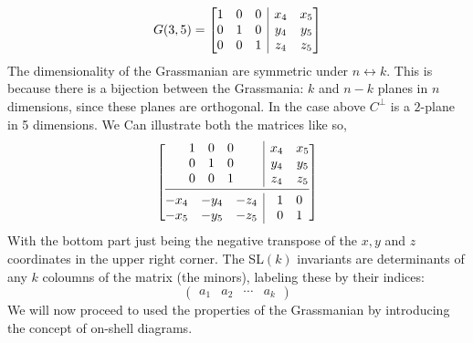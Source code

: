 \documentclass[letter,11pt]{article}
\begin{document}
\begin{equation}G(3,5) = 
\left[ \begin{array}{@{}c|c@{}}
	\begin{matrix}
		1 & 0 &  0 \\
		0 & 1 &  0 \\
		0 & 0 &  1 \\
	\end{matrix} 
	& 	\begin{matrix}
		x_4 & x_5  \\
		y_4 & y_5  \\
		z_4 & z_5  \\
	\end{matrix}  \\
\end{array} \right]
\end{equation}
The dimensionality of the Grassmanian are symmetric under $n\leftrightarrow k$. This is because there is a bijection between the Grassmania: $k$ and $n-k$ planes in $n$ dimensions, since these planes are orthogonal. In the case above $C^{\perp}$ is a $2$-plane in 5 dimensions. We Can illustrate both the matrices like so,
\begin{equation}
	\left[ \begin{array}{@{}c|c@{}}
		\begin{matrix}
			1 & 0 &  0 \\
			0 & 1 &  0 \\
			0 & 0 &  1 \\
		\end{matrix} 
		& 	\begin{matrix}
			x_4 & x_5  \\
			y_4 & y_5  \\
			z_4 & z_5  \\
		\end{matrix}  \\
	\cmidrule[0.4pt]{1-2}
		\begin{matrix}
		-x_4 & -y_4 & -z_4  \\
		-x_5 & -y_5 & -z_5 \\
	\end{matrix} 
	& 	\begin{matrix}
	1 & 0  \\
	0 & 1  \\
\end{matrix} 
	\end{array} \right]
\end{equation}
With the bottom part just being the negative transpose of the $x,y$ and $z$ coordinates in the upper right corner. The SL$(k)$ invariants are determinants of any $k$ coloumns of the matrix (the minors), labeling these by their indices:
\begin{equation}
\begin{pmatrix}
a_1&a_2&\cdots &a_k
\end{pmatrix}
\end{equation}
We will now proceed to used the properties of the Grassmanian by introducing the concept of on-shell diagrams.
\newpage
\end{document}
